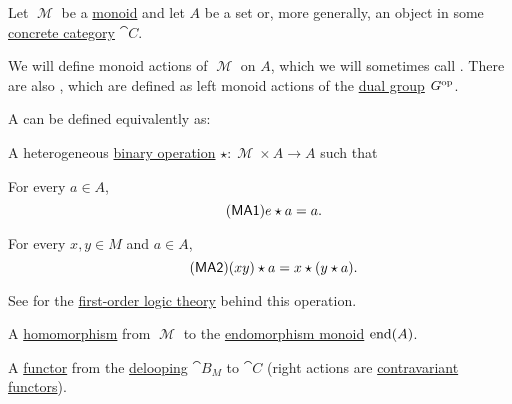 \begin{definition}\label{def:monoid_action}
  Let \( \mscrM \) be a \hyperref[def:unital_magma/monoid]{monoid} and let \( A \) be a set or, more generally, an object in some \hyperref[def:concrete_category]{concrete category} \( \cat{C} \).

  We will define monoid actions of \( \mscrM \) on \( A \), which we will sometimes call . There are also , which are defined as left monoid actions of the \hyperref[def:group/duality]{dual group} \( G^{\operatorname{op}} \).

  A  can be defined equivalently as:
  \begin{thmenum}
     A heterogeneous \hyperref[def:magma]{binary operation} \( \star: \mscrM \times A \to A \) such that
    \begin{thmenum}
       For every \( a \in A \),
      \begin{equation}\label{eq:def:monoid_action/operation/identity}\tag{\logic{MA1}}
        e \star a = a.
      \end{equation}

       For every \( x, y \in M \) and \( a \in A \),
      \begin{equation}\label{eq:def:monoid_action/operation/compatibility}\tag{\logic{MA2}}
        (xy) \star a = x \star (y \star a).
      \end{equation}
    \end{thmenum}

    See  for the \hyperref[def:first_order_theory]{first-order logic theory} behind this operation.

     A \hyperref[def:unital_magma/homomorphism]{homomorphism} from \( \mscrM \) to the \hyperref[def:endomorphism_monoid]{endomorphism monoid} \( \operatorname{end}(A) \).

     A \hyperref[def:functor]{functor} from the \hyperref[def:monoid_delooping]{delooping} \( \cat{B}_M \) to \( \cat{C} \) (right actions are \hyperref[rem:contravariant_functor]{contravariant functors}).
  \end{thmenum}
\end{definition}

